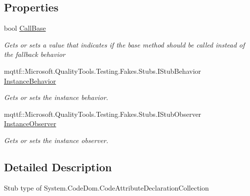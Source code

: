 \subsection*{Properties}
\begin{DoxyCompactItemize}
\item 
bool \hyperlink{class_system_1_1_code_dom_1_1_fakes_1_1_stub_code_attribute_declaration_collection_a0d1cc9e5431eb003cd611ebcda991212}{Call\-Base}
\begin{DoxyCompactList}\small\item\em Gets or sets a value that indicates if the base method should be called instead of the fallback behavior\end{DoxyCompactList}\item 
mqttf\-::\-Microsoft.\-Quality\-Tools.\-Testing.\-Fakes.\-Stubs.\-I\-Stub\-Behavior \hyperlink{class_system_1_1_code_dom_1_1_fakes_1_1_stub_code_attribute_declaration_collection_a32945ae123d307b1845c79b0fc7af160}{Instance\-Behavior}
\begin{DoxyCompactList}\small\item\em Gets or sets the instance behavior.\end{DoxyCompactList}\item 
mqttf\-::\-Microsoft.\-Quality\-Tools.\-Testing.\-Fakes.\-Stubs.\-I\-Stub\-Observer \hyperlink{class_system_1_1_code_dom_1_1_fakes_1_1_stub_code_attribute_declaration_collection_a2756d2957578fe6647f2808893e807c4}{Instance\-Observer}
\begin{DoxyCompactList}\small\item\em Gets or sets the instance observer.\end{DoxyCompactList}\end{DoxyCompactItemize}


\subsection{Detailed Description}
Stub type of System.\-Code\-Dom.\-Code\-Attribute\-Declaration\-Collection




